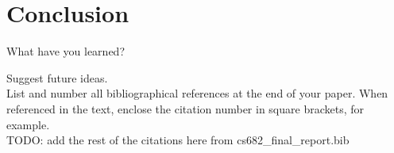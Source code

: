 \documentclass[10pt,twocolumn,letterpaper]{article}
\begin{document}
\section{Conclusion}
\label{sec:conclusion}
What have you learned? 

Suggest future ideas.\\

List and number all bibliographical references at the end of your paper. When referenced in the text,
enclose the citation number in square brackets, for
example. \\

TODO: add the rest of the citations here from cs682\_final\_report.bib

\cite{slavkovikj2014image}
\cite{patterson2014sun}
\cite{rundle2011using}
\cite{zhou2017places}
\cite{DBLP:journals/corr/ZhouKLOT14}
\cite{DBLP:journals/corr/Wang15l}
\cite{DBLP:journals/corr/HeZRS15}
\cite{DBLP:journals/corr/ZagoruykoK16}
\cite{DBLP:journals/corr/ZhouKLTO16}
\cite{koehrsen2018blog}

{\small


}
\end{document}
